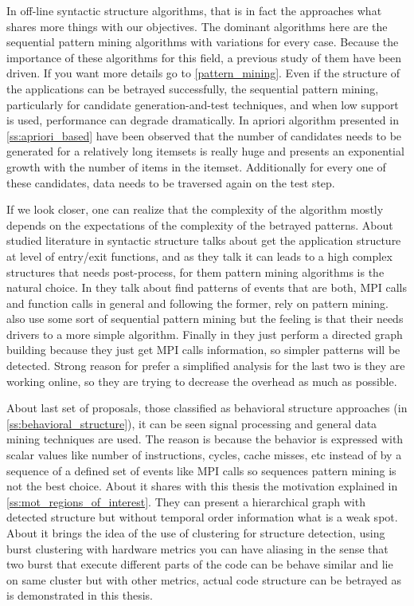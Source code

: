 In off-line syntactic structure algorithms, that
is in fact the approaches what shares more things with our objectives. The
dominant algorithms here are the sequential pattern mining algorithms with
variations for every case. Because the importance of these algorithms for this
field, a previous study of them have been driven. If you want more details go to
\ref{pattern_mining}. Even if the structure of the applications can be
betrayed successfully, the sequential pattern mining, particularly for candidate 
generation-and-test techniques, and when low support is used, performance can 
degrade dramatically. In apriori algorithm presented in \ref{ss:apriori_based} 
have been observed that
the number of candidates needs to be generated for a relatively long itemsets is
really huge and presents an exponential growth with the number of items in the
itemset. Additionally for every one of these candidates, data needs to be
traversed again on the test step.

If we look closer, one can realize that the complexity of the algorithm mostly 
depends on the expectations of the complexity of the betrayed patterns. 
About studied literature in syntactic 
structure \cite{Safyallah2006} \cite{Zhao2008} talks about get the 
application structure at level of entry/exit functions, and as they talk it can 
leads to a high complex structures that needs post-process, for them 
pattern mining algorithms is the natural choice. In \cite{trahay2015selecting}
they talk about find patterns of events that are both, MPI calls and function
calls in general and following the former, rely on pattern mining. 
\cite{noeth2009scalatrace} also use some sort of sequential pattern mining but 
the feeling is that their needs drivers to a more simple algorithm. Finally in
\cite{aguilar2016event} they just perform a directed graph building because they
just get MPI calls information, so simpler patterns will be detected. Strong
reason for prefer a simplified analysis for the last two is they are working 
online, so they are trying to decrease the overhead as much as possible.

About last set of proposals, those classified as behavioral
structure approaches (in \ref{ss:behavioral_structure}), it can be seen signal
processing and general data mining techniques are used. The reason is
because the behavior is expressed with scalar values like number of
instructions, cycles, cache misses, etc instead of by a sequence of a 
defined set of events like MPI calls so sequences pattern mining is not the best
choice. About \cite{casas2007automatic} it shares with this thesis the motivation 
explained in \ref{ss:mot_regions_of_interest}. They can present a
hierarchical graph with detected structure but without temporal order
information what is a weak spot. About \cite{gonzalez2013application} it brings 
the idea of the use
of clustering for structure detection, using burst clustering with hardware 
metrics you can have aliasing in the sense that two burst that execute different
parts of the code can be behave similar and lie on same cluster but with other
metrics, actual code structure can be betrayed as is demonstrated in this
thesis.
